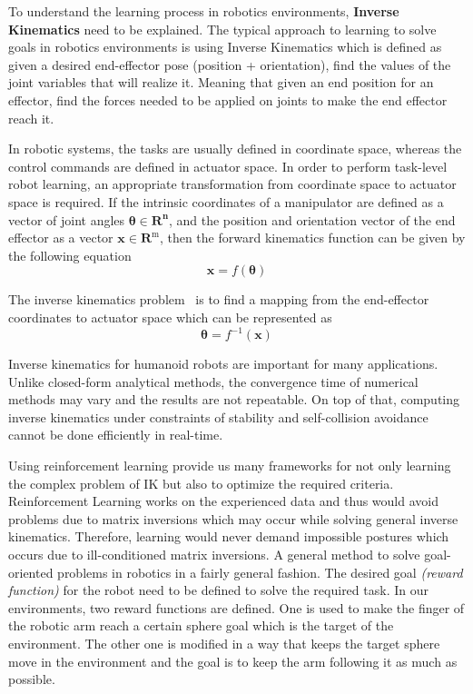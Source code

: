 To understand the learning process in robotics environments, \textbf{Inverse Kinematics} need to be explained. The typical approach to learning to solve goals in robotics environments is using Inverse Kinematics which is defined as given a desired end-effector pose (position + orientation), find the values of the joint variables that will realize it. Meaning that given an end position for an effector, find the forces needed to be applied on joints to make the end effector reach it.

In robotic systems, the tasks are usually defined in coordinate space, whereas the control commands are defined in actuator space. In order to perform task-level robot learning, an appropriate transformation from coordinate space to actuator space is required. If the intrinsic coordinates of a manipulator are defined as a vector of joint angles \(\boldsymbol{\theta} \in \mathbf{R}^{\mathbf{n}}\), and the position and orientation vector of the end effector as a vector \(\mathbf{x} \in \mathbf{R}^{\mathrm{m}}\), then the forward kinematics function can be given by the following equation 
\begin{equation}
        \mathbf{x}=f(\boldsymbol{\theta})
\end{equation}

The inverse kinematics problem~\parencite{colome2011smooth, chua2013robust} is to find a mapping from the end-effector coordinates to actuator space which can be represented as
\begin{equation}
        \boldsymbol{\theta}=f^{-1}(\mathbf{x})
\end{equation}

Inverse kinematics for humanoid robots are important for many applications. Unlike closed-form analytical methods, the convergence time of numerical methods may vary and the results are not repeatable. On top of that, computing inverse kinematics under constraints of stability and self-collision avoidance cannot be done efficiently in real-time.

Using reinforcement learning provide us many frameworks for not only learning the complex problem of IK but also to optimize the required criteria. Reinforcement Learning works on the experienced data and thus would avoid problems due to matrix inversions which may occur while solving general inverse kinematics. Therefore, learning would never demand impossible postures which occurs due to ill-conditioned matrix inversions. A general method to solve goal-oriented problems in robotics in a fairly general fashion. The desired goal \textit{(reward function)} for the robot need to be defined to solve the required task. In our environments, two reward functions are defined. One is used to make the finger of the robotic arm reach a certain sphere goal which is the target of the environment. The other one is modified in a way that keeps the target sphere move in the environment and the goal is to keep the arm following it as much as possible. 


